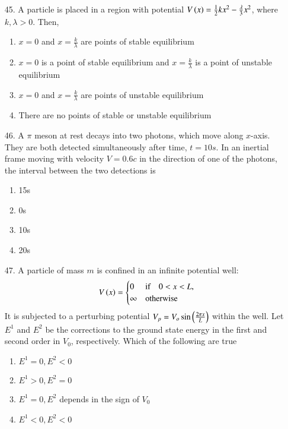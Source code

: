 \documentclass[journal,12pt,onecolumn]{IEEEtran}
\theoremstyle{remark}
\begin{document}
\begin{enumerate}
        \item[45.] A particle is placed in a region with potential $V\left(x\right) = \frac{1}{2}kx^2 - 
            \frac{\lambda}{3}x^2$, where $k, \lambda > 0$. Then,
            \hfill{}
            \begin{enumerate}
                \item $x = 0$ and $x = \frac{k}{\lambda}$ are points of stable equilibrium
                \item $x = 0$ is a point of stable equilibrium and  $x = \frac{k}{\lambda}$ is a point of unstable equilibrium
                \item $x = 0$ and $x = \frac{k}{\lambda}$ are points of unstable equilibrium
                \item There are no points of stable or unstable equilibrium
            \end{enumerate}
        \item[46.] A $\pi$ meson at rest decays into two photons, which move along $x$-axis. They are
            both detected simultaneously after time, $t = 10s$. In an inertial frame moving with velocity 
            $V = 0.6c$ in the direction of one of the photons, the interval between the two detections is
            \hfill{}
            \begin{enumerate}
                \item 15s
                \item 0s
                \item 10s
                \item 20s
            \end{enumerate}

        \item[47.] A particle of mass $m$ is confined in an infinite potential well:
            \begin{align}
                V\left(x\right) =  \begin{cases}
                    0 & \textnormal{if}  \quad 0 < x < L,\\
                    \infty & \textnormal{otherwise}
                \end{cases}
            \end{align}
            It is subjected to a perturbing potential $V_p = V_o \sin \left(\frac{2\pi x}{L}\right)$
            within the well. Let $E^1$ and $E^2$ be the corrections to the ground state energy in the 
            first and second order in $V_0$, respectively. Which of the following are true
            \hfill{}
            \begin{enumerate}
                \item $E^1 = 0, E^2 < 0$
                \item $E^1>0, E^2 = 0$
                \item $E^1 = 0, E^2$ depends in the sign of $V_0$
                \item $E^1 < 0, E^2 < 0$
            \end{enumerate}

\end{enumerate}
\end{document}
